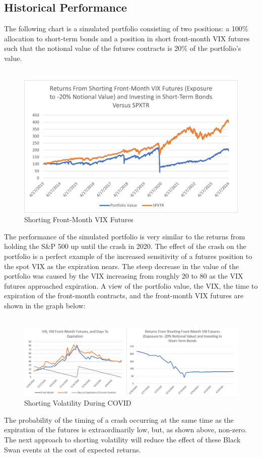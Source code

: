 \documentclass[11pt, oneside]{book}
\begin{document}
\subsection{Historical Performance} \label{Investing-ShortFrontFut-Historical}
The following chart is a simulated portfolio consisting of two positions: a 100\% allocation to short-term bonds and a position in short front-month VIX futures such that the notional value of the futures contracts is 20\% of the portfolio's value.\\
\\
\begin{figure}[H]
\centering
\includegraphics[width=\textwidth]{ShortingFrontMonthFutures.png}
\caption{Shorting Front-Month VIX Futures} \label{Fig-ShortFrontMonth}
\end{figure}
\noindent
The performance of the simulated portfolio is very similar to the returns from holding the S\&P 500 up until the crash in 2020. The effect of the crash on the portfolio is a perfect example of the increased sensitivity of a futures position to the spot VIX as the expiration nears. The steep decrease in the value of the portfolio was caused by the VIX increasing from roughly 20 to 80 as the VIX futures approached expiration. A view of the portfolio value, the VIX, the time to expiration of the front-month contracts, and the front-month VIX futures are shown in the graph below:\\
\\
\begin{figure}[H]
\centering
\includegraphics[width=\textwidth]{ShortingVolatilityDuringCovid.png}
\caption{Shorting Volatility During COVID} \label{Fig-ShortVolDuringCOVID}
\end{figure}
\noindent
The probability of the timing of a crash occurring at the same time as the expiration of the futures is extraordinarily low, but, as shown above, non-zero. The next approach to shorting volatility will reduce the effect of these Black Swan events at the cost of expected returns.
\end{document}
